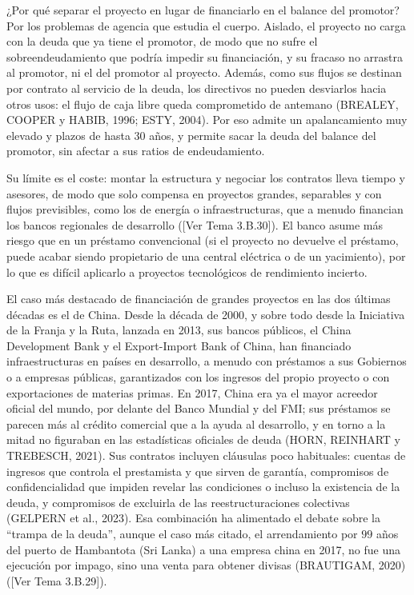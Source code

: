 \documentclass[10pt,a4paper]{article}
\newcommand{\authorfont}[1]{{\fontfamily{EBGaramond-TLF}\selectfont #1}}
\begin{document}
¿Por qué separar el proyecto en lugar de financiarlo en el balance del promotor? Por los problemas de agencia que estudia el cuerpo. Aislado, el proyecto no carga con la deuda que ya tiene el promotor, de modo que no sufre el sobreendeudamiento que podría impedir su financiación, y su fracaso no arrastra al promotor, ni el del promotor al proyecto. Además, como sus flujos se destinan por contrato al servicio de la deuda, los directivos no pueden desviarlos hacia otros usos: el flujo de caja libre queda comprometido de antemano (BREALEY, COOPER y HABIB, 1996; ESTY, 2004). Por eso admite un apalancamiento muy elevado y plazos de hasta $30$ años, y permite sacar la deuda del balance del promotor, sin afectar a sus ratios de endeudamiento.

Su límite es el coste: montar la estructura y negociar los contratos lleva tiempo y asesores, de modo que solo compensa en proyectos grandes, separables y con flujos previsibles, como los de energía o infraestructuras, que a menudo financian los bancos regionales de desarrollo ([\authorfont{Ver Tema 3.B.30}]). El banco asume más riesgo que en un préstamo convencional (si el proyecto no devuelve el préstamo, puede acabar siendo propietario de una central eléctrica o de un yacimiento), por lo que es difícil aplicarlo a proyectos tecnológicos de rendimiento incierto.

El caso más destacado de financiación de grandes proyectos en las dos últimas décadas es el de China. Desde la década de 2000, y sobre todo desde la Iniciativa de la Franja y la Ruta, lanzada en 2013, sus bancos públicos, el China Development Bank y el Export-Import Bank of China, han financiado infraestructuras en países en desarrollo, a menudo con préstamos a sus Gobiernos o a empresas públicas, garantizados con los ingresos del propio proyecto o con exportaciones de materias primas. En 2017, China era ya el mayor acreedor oficial del mundo, por delante del Banco Mundial y del FMI; sus préstamos se parecen más al crédito comercial que a la ayuda al desarrollo, y en torno a la mitad no figuraban en las estadísticas oficiales de deuda (HORN, REINHART y TREBESCH, 2021). Sus contratos incluyen cláusulas poco habituales: cuentas de ingresos que controla el prestamista y que sirven de garantía, compromisos de confidencialidad que impiden revelar las condiciones o incluso la existencia de la deuda, y compromisos de excluirla de las reestructuraciones colectivas (GELPERN et al., 2023). Esa combinación ha alimentado el debate sobre la ``trampa de la deuda'', aunque el caso más citado, el arrendamiento por $99$ años del puerto de Hambantota (Sri Lanka) a una empresa china en 2017, no fue una ejecución por impago, sino una venta para obtener divisas (BRAUTIGAM, 2020) ([\authorfont{Ver Tema 3.B.29}]).
\end{document}
